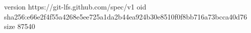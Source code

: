 version https://git-lfs.github.com/spec/v1
oid sha256:e66e2f4f55a4268e5ee725a1da2b44ea924b30e8510f0f8bb716a73bcca40d76
size 87540
